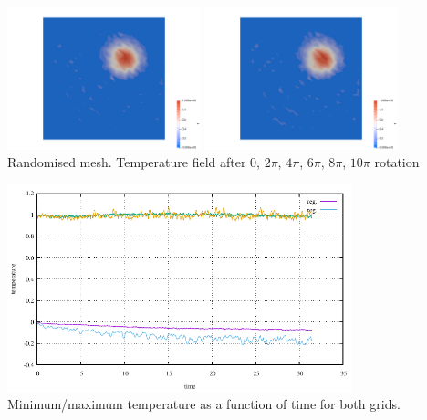 \begin{center}
\includegraphics[width=5.6cm]{python_codes/fieldstone_45/results/rand0004}
\includegraphics[width=5.6cm]{python_codes/fieldstone_45/results/rand0005}\\
{\captionfont Randomised mesh. Temperature field after 0, $2\pi$, $4\pi$, $6\pi$, $8\pi$, $10\pi$ rotation} 
\end{center}

\begin{center}
\includegraphics[width=10cm]{python_codes/fieldstone_45/results/T.pdf}\\
{\captionfont Minimum/maximum temperature as a function of time for both grids.} 
\end{center}

